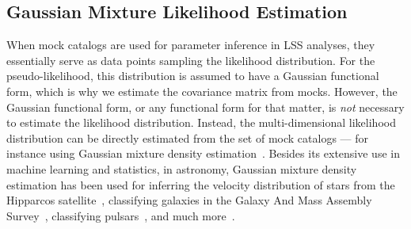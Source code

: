\documentclass[12pt, letterpaper, preprint]{aastex}
\newcommand{\lss}{{\small{LSS}}\xspace}
\begin{document}
\subsection{Gaussian Mixture Likelihood Estimation} \label{sec:gmm}
When mock catalogs are used for parameter inference in \lss analyses,
they essentially serve as data points sampling the likelihood distribution.
For the pseudo-likelihood, this distribution is assumed to have a
Gaussian functional form, which is why we estimate the covariance matrix 
from mocks. However, the Gaussian functional form, or any functional form for 
that matter, is \emph{not} necessary to estimate the likelihood distribution. 
Instead, the multi-dimensional likelihood distribution 
can be directly estimated from the set of mock catalogs --- for 
instance using Gaussian mixture density 
estimation~\citep{Press:1992:NRC:148286,9780471006268}. 
Besides its extensive use in machine learning and statistics, 
in astronomy, Gaussian mixture density estimation has been used for 
inferring the velocity distribution of stars from the Hipparcos 
satellite~\citep{bovy2011}, classifying galaxies in the Galaxy And Mass Assembly 
Survey~\citep{taylor2015}, classifying pulsars~\citep{lee2012}, and much more~\citep[see also][]{hogg2010,kuhn2017}. 
\end{document}
